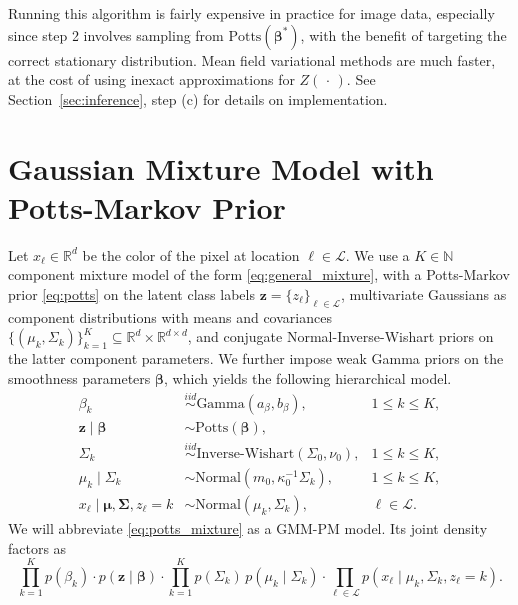\documentclass[12pt]{article}
\newcommand{\N}{\mathbb{N}}
\newcommand{\R}{\mathbb{R}}
\newcommand{\GG}{\mathcal{G}}
\newcommand{\LL}{\mathcal{L}}
\newcommand{\NN}{\mathcal{N}}
\newcommand{\iid}{\overset{iid}{\sim}}
\begin{document}
Running this algorithm is fairly expensive in practice for image data,
especially since step 2 involves sampling from $\text{Potts}(\bm{\beta}^*)$,
with the benefit of targeting the correct stationary distribution.
Mean field variational methods are much faster, at the cost of using inexact
approximations for $Z(\,\cdot\,)$.
See Section~\ref{sec:inference}, step (c) for details on implementation.




\section{Gaussian Mixture Model with Potts-Markov Prior}
\label{sec:model}

Let $x_\ell \in \R^d$ be the color of the pixel at location $\ell \in \LL$.
We use a $K \in \N$ component mixture model of the form
\eqref{eq:general_mixture}, with a Potts-Markov prior \eqref{eq:potts} on the
latent class labels $\bm{z} = \{z_\ell\}_{\ell \in \LL}$, multivariate
Gaussians as component distributions with means and covariances $\{(\mu_k,
\Sigma_k)\}_{k = 1}^K \subseteq \R^d \times \R^{d\times d}$, and conjugate
Normal-Inverse-Wishart priors on the latter component parameters.
We further impose weak Gamma priors on the smoothness parameters $\bm\beta$,
which yields the following hierarchical model.
\begin{equation}
\label{eq:potts_mixture}
\begin{aligned}
    \beta_k
        &\iid \text{Gamma}(a_\beta, b_\beta),
        & 1 \leq k \leq K, \\
    \bm{z} \mid \bm{\beta}
        &\sim \text{Potts}(\bm\beta), \\
    \Sigma_k
        &\iid \text{Inverse-Wishart}(\Sigma_0, \nu_0),
        & 1 \leq k \leq K, \\
    \mu_k \mid \Sigma_k
        &\sim \text{Normal}(m_0, \kappa_0^{-1}\Sigma_k),
        & 1 \leq k \leq K, \\
    x_\ell \mid \bm{\mu}, \bm{\Sigma}, z_{\ell} = k
        &\sim \text{Normal}(\mu_k, \Sigma_k),
        & \ell \in \LL.
\end{aligned}
\end{equation}
We will abbreviate \eqref{eq:potts_mixture} as a GMM-PM model.
Its joint density factors as
\begin{equation}
\label{eq:joint_density}
    \prod_{k = 1}^K p(\beta_k)
        \cdot p(\bm{z}\mid\bm{\beta})
        \cdot \prod_{k = 1}^K p(\Sigma_k)\, p(\mu_k \mid \Sigma_k)
        \cdot \prod_{\ell \in \LL} p(x_\ell \mid \mu_k, \Sigma_k, z_\ell = k).
\end{equation}
\end{document}
